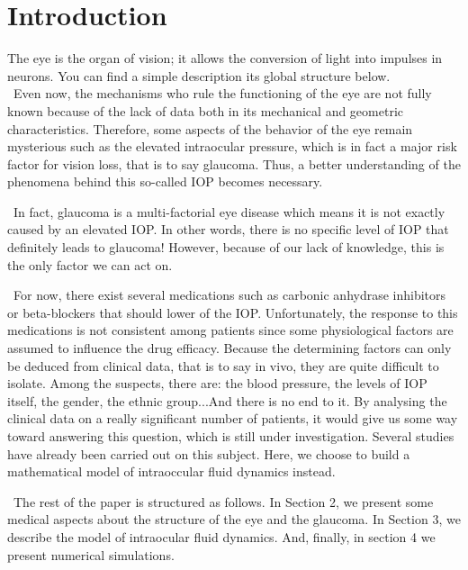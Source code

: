 \documentclass[english,12pt]{article}
\begin{document}
\vskip25mm
\section{Introduction}\label{S1}
The eye is the organ of vision; it allows the conversion of light into impulses in neurons. You can find a simple description its global structure below.\\

\ Even now, the mechanisms who rule the functioning of the eye are not fully known because of the lack of data both in its mechanical and geometric characteristics. Therefore, some aspects of the behavior of the eye remain mysterious such as the elevated intraocular pressure, which is in fact a major risk factor for vision loss, that is to say glaucoma. Thus, a better understanding of the phenomena behind this so-called IOP becomes necessary.

\ In fact, glaucoma is a multi-factorial eye disease which means it is not exactly caused by an elevated IOP. In other words, there is no specific level of IOP that definitely leads to glaucoma! However, because of our lack of knowledge, this is the only factor we can act on. 

\ For now, there exist several medications such as carbonic anhydrase inhibitors or beta-blockers that 
should lower of the IOP. Unfortunately, the response to this medications is not consistent among patients since some physiological factors are assumed to influence the drug efficacy. Because the determining factors can only be deduced from clinical data, that is to say in vivo, they are quite difficult to isolate. Among the suspects, there are: the blood pressure, the levels of IOP itself, the gender, the ethnic group...And there is no end to it. By analysing the clinical data on a really significant number of patients, it would give us some way toward answering this question, which is still under investigation. Several studies have already been carried out on this subject. Here, we choose to build a mathematical model of intraoccular fluid dynamics instead. 

\ The rest of the paper is structured as follows. In Section 2, we present some medical aspects about the structure of the eye and the glaucoma. In Section 3, we describe the model of intraocular fluid dynamics. And, finally, in section 4 we present numerical simulations.
\end{document}
